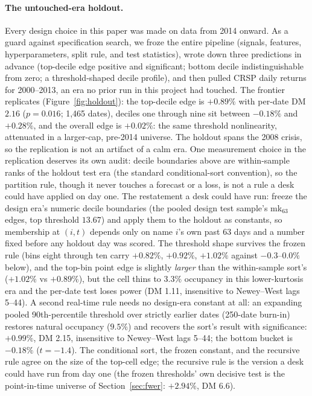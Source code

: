 \documentclass[11pt]{article}
\theoremstyle{remark}
\begin{document}
\paragraph{The untouched-era holdout.} Every design choice in this paper
was made on data from 2014 onward. As a guard against specification
search, we froze the entire pipeline (signals, features,
hyperparameters, split rule, and test statistics), wrote down three
predictions in advance (top-decile edge positive and significant; bottom decile
indistinguishable from zero; a threshold-shaped decile profile), and
then pulled CRSP daily returns for 2000--2013, an era no prior run in
this project had touched. The frontier replicates
(Figure~\ref{fig:holdout}): the top-decile edge is $+0.89\%$ with
per-date DM $2.16$ ($p=0.016$; 1{,}465 dates), deciles one through nine
sit between $-0.18\%$ and $+0.28\%$, and the overall edge is
$+0.02\%$: the same threshold nonlinearity, attenuated in a
larger-cap, pre-2014 universe. The holdout spans the 2008 crisis, so
the replication is not an artifact of a calm era.
One measurement choice in the replication deserves its own audit:
decile boundaries above are within-sample ranks of the holdout test
era (the standard conditional-sort convention), so the partition rule, though it never touches a forecast or a loss,
is not a rule a desk could have applied on day one.
The restatement a desk could have run: freeze the design era's
numeric decile boundaries (the pooled design test sample's mk$_{63}$
edges, top threshold $13.67$) and apply them to the holdout as
constants, so membership at $(i,t)$ depends only on name $i$'s own
past 63 days and a number fixed before any holdout day was scored.
The threshold shape survives the frozen rule (bins eight through
ten carry $+0.82\%$, $+0.92\%$, $+1.02\%$ against $-0.3$--$0.0\%$
below), and the top-bin point edge is slightly \emph{larger} than
the within-sample sort's ($+1.02\%$ vs $+0.89\%$), but the cell
thins to $3.3\%$ occupancy in this lower-kurtosis era and the
per-date test loses power (DM 1.11, insensitive to Newey--West lags
5--44). A second real-time rule needs no design-era constant at all: an
expanding pooled 90th-percentile threshold over strictly earlier
dates (250-date burn-in) restores natural occupancy ($9.5\%$) and
recovers the sort's result with significance: $+0.99\%$, DM 2.15,
insensitive to Newey--West lags 5--44; the bottom bucket is
$-0.18\%$ ($t=-1.4$). The conditional sort, the frozen constant, and
the recursive rule agree on the size of the top-cell edge; the
recursive rule is the version a desk could have run from day one
(the frozen thresholds' own decisive test is the point-in-time
universe of Section~\ref{sec:fwer}: $+2.94\%$, DM 6.6).
\end{document}
